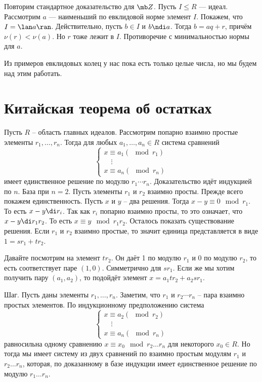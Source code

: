 \proof Повторим стандартное доказательство для $\mb Z$. Пусть $I\leq R$ --- идеал. Рассмотрим $a$ --- наименьший по евклидовой норме элемент $I$. Покажем, что $I=\lan a\ran$. Действительно, пусть $b\in I$ и $b\ndi a$. Тогда $b=aq+r$, причём $\nu(r)<\nu(a)$. Но $r$ тоже лежит в $I$. Противоречие с минимальностью нормы для $a$.
\endproof


Из примеров евклидовых колец у нас пока есть только целые числа, но мы будем над этим работать.






\section{Китайская теорема об остатках}

 Пусть $R$ -- область главных идеалов. Рассмотрим попарно взаимно простые элементы $r_1,\dots,r_n$. Тогда для любых $a_1,\dots,a_n\in R$ система сравнений
$$ \begin{cases}
x\equiv a_1 (\mod r_1)\\
\quad \vdots \\
x\equiv a_n (\mod r_n)
\end{cases}$$
имеет единственное решение по модулю $r_1\cdots r_n$.
\ethrm
\proof Доказательство идёт индукцией по $n$. База при $n=2$. Пусть элементы $r_1$ и $r_2$ взаимно просты. Прежде всего покажем единственность. Пусть $x$ и $y$ -- два решения. Тогда $x-y \equiv 0 \mod r_1$. То есть $x-y \di r_i$. Так как $r_i$ попарно взаимно просты, то это означает, что $x-y \di r_1 r_2 $. То есть $x\equiv y \mod r_1 r_2$.
Осталось показать существование решения. Если $r_1$ и $r_2$ взаимно простые, то значит единица представляется в виде $1=sr_1+tr_2$.

Давайте посмотрим на элемент $tr_2$. Он даёт 1 по модулю $r_1$ и 0 по модулю $r_2$, то есть соответствует паре $(1,0)$. Симметрично для  $sr_1$. Если же мы хотим получить пару $(a_1,a_2)$, то подойдёт элемент $x=a_1tr_2+a_2sr_1$.

Шаг. Пусть даны элементы $r_1,\dots, r_n$. Заметим, что $r_1$ и $r_2\cdots r_n$ -- пара взаимно простых элементов. По индукционному предположению система 
$$ \begin{cases}
x\equiv a_2 (\mod r_2)\\
\quad \vdots \\
x\equiv a_n (\mod r_n)
\end{cases}$$
равносильна одному сравнению $x\equiv x_0 \mod r_2\dots r_n$ для некоторого $x_0\in R$. Но тогда мы имеет систему из двух сравнений по взаимно простым модулям $r_1$ и $r_2\dots r_n$, которая, по доказанному в базе индукции имеет единственное решение по модулю $r_1\dots r_n$.
\endproof









